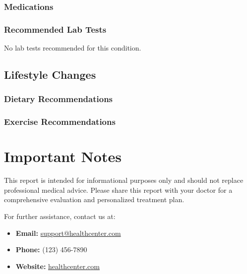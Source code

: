 \documentclass[a4paper,12pt]{article}
\begin{document}
\subsubsection*{Medications}

\begin{itemize}[leftmargin=*]



\end{itemize}



\subsubsection*{Recommended Lab Tests}

No lab tests recommended for this condition.



\subsection*{Lifestyle Changes}

\subsubsection*{Dietary Recommendations}

\begin{itemize}[leftmargin=*]



\end{itemize}



\subsubsection*{Exercise Recommendations}

\begin{itemize}[leftmargin=*]



\end{itemize}



\section*{Important Notes}

This report is intended for informational purposes only and should not replace professional medical advice. Please share this report with your doctor for a comprehensive evaluation and personalized treatment plan.



For further assistance, contact us at:

\begin{itemize}[leftmargin=*]

    \item \textbf{Email:} \href{mailto:support@healthcenter.com}{support@healthcenter.com}

    \item \textbf{Phone:} (123) 456-7890

    \item \textbf{Website:} \href{https://healthcenter.com}{healthcenter.com}

\end{itemize}
\end{document}
